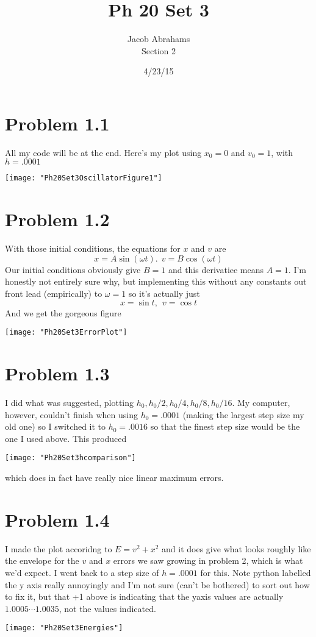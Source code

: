 \documentclass[12pt]{article}
\begin{document}
	\title{Ph 20 Set 3}
	\author{Jacob Abrahams \\ Section 2}
	\date{4/23/15}
	\maketitle
      
	\section*{Problem 1.1}
		All my code will be at the end. Here's my plot using $x_0 = 0$ and $v_0 = 1$, with $h = .0001$
		\begin{center}
			\texttt{[image: "Ph20Set3OscillatorFigure1"]}
		\end{center}
	\section*{Problem 1.2}
		With those initial conditions, the equations for $x$ and $v$ are
		\[x = A\sin{(\omega t)}.\ \ v = B\cos{(\omega t)}\]
		Our initial conditions obviously give $B = 1$ and this derivatiee means $A = 1$. I'm honestly not entirely sure why, but implementing this without any constants out front lead (empirically) to $\omega = 1$ so it's actually just
		\[x = \sin{t},\ \ v = \cos{t}\]
		And we get the gorgeous figure
		\begin{center}
			\texttt{[image: "Ph20Set3ErrorPlot"]}
		\end{center}
	\section*{Problem 1.3}
		I did what was suggested, plotting $h_0, h_0/2, h_0/4, h_0/8, h_0/16$. My computer, however, couldn't finish when using $h_0 = .0001$ (making the largest step size my old one) so I switched it to $h_0 = .0016$ so that the finest step size would be the one I used above. This produced
		\begin{center}
			\texttt{[image: "Ph20Set3hcomparison"]}
		\end{center}
		which does in fact have really nice linear maximum errors. \pagebreak
	\section*{Problem 1.4}
		I made the plot accoridng to $E = v^2 + x^2$ and it does give what looks roughly like the envelope for the $v$ and $x$ errors we saw growing in problem 2, which is what we'd expect. I went back to a step size of $h = .0001$ for this. Note python labelled the y axis really annoyingly and I'm not sure (can't be bothered) to sort out how to fix it, but that +1 above is indicating that the yaxis values are actually $1.0005 \cdots 1.0035$, not the values indicated. 
		\begin{center}
			\texttt{[image: "Ph20Set3Energies"]}
		\end{center}
		\pagebreak
\end{document}
